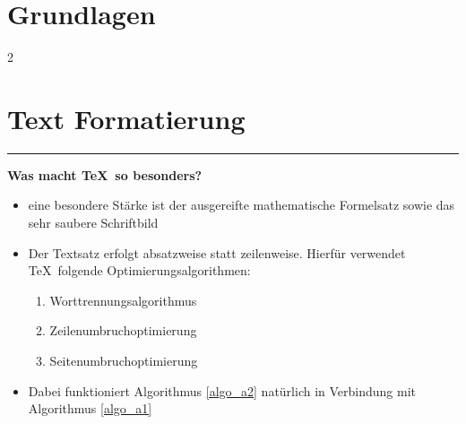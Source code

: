 \documentclass[titlepage]{scrartcl}
\theoremstyle{das_hat_stil}
\begin{document}
\section{Grundlagen}

\begin{onehalfspace}
    \blindtext
\end{onehalfspace}

\setlength{\columnsep}{1cm}
\setlength{\columnseprule}{2pt}


\begin{multicols}{2} %
    \blindtext
\end{multicols}



\newpage %
\section{Text Formatierung}

\pagecolor{pastellblau}

\begin{minipage}{\textwidth} %

\hrule %

\vspace{5pt}

\textbf{Was macht \TeX\ so besonders?}

\renewcommand{\labelitemi}{>}

\begin{itemize}
    \item eine besondere Stärke ist der ausgereifte mathematische Formelsatz sowie das sehr saubere Schriftbild
    \item Der Textsatz erfolgt absatzweise statt zeilenweise. Hierfür verwendet \TeX\ folgende Optimierungsalgorithmen:

    \renewcommand{\theenumi}{A\arabic{enumi}}
    \renewcommand{\labelenumi}{(\theenumi)}

    \begin{enumerate}
        \item Worttrennungsalgorithmus \label{algo_a1}
        \item Zeilenumbruchoptimierung \label{algo_a2}
        \item Seitenumbruchoptimierung \label{algo_a3}
    \end{enumerate}

    \item Dabei funktioniert Algorithmus \ref{algo_a2} natürlich in Verbindung mit Algorithmus \ref{algo_a1}

\end{itemize}

\end{minipage}
\end{document}
